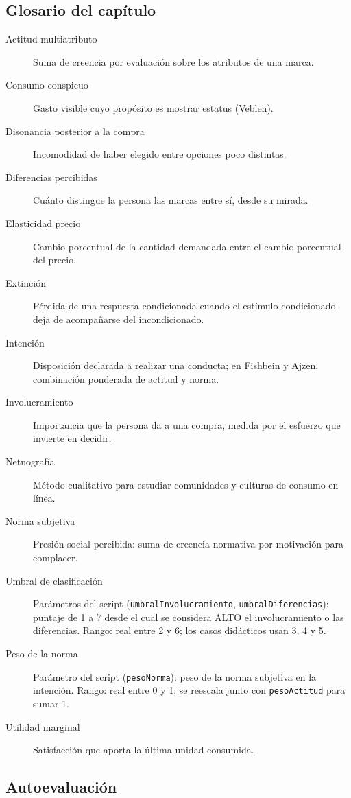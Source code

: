 \subsection*{Glosario del capítulo}
\begin{description}
  \item[Actitud multiatributo] Suma de creencia por evaluación sobre los atributos de una marca.
  \item[Consumo conspicuo] Gasto visible cuyo propósito es mostrar estatus (Veblen).
  \item[Disonancia posterior a la compra] Incomodidad de haber elegido entre opciones poco distintas.
  \item[Diferencias percibidas] Cuánto distingue la persona las marcas entre sí, desde su mirada.
  \item[Elasticidad precio] Cambio porcentual de la cantidad demandada entre el cambio porcentual del precio.
  \item[Extinción] Pérdida de una respuesta condicionada cuando el estímulo condicionado deja de acompañarse del incondicionado.
  \item[Intención] Disposición declarada a realizar una conducta; en Fishbein y Ajzen, combinación ponderada de actitud y norma.
  \item[Involucramiento] Importancia que la persona da a una compra, medida por el esfuerzo que invierte en decidir.
  \item[Netnografía] Método cualitativo para estudiar comunidades y culturas de consumo en línea.
  \item[Norma subjetiva] Presión social percibida: suma de creencia normativa por motivación para complacer.
  \item[Umbral de clasificación] Parámetros del script (\texttt{umbralInvolucramiento}, \texttt{umbralDiferencias}): puntaje de 1 a 7 desde el cual se considera ALTO el involucramiento o las diferencias. Rango: real entre 2 y 6; los casos didácticos usan 3, 4 y 5.
  \item[Peso de la norma] Parámetro del script (\texttt{pesoNorma}): peso de la norma subjetiva en la intención. Rango: real entre 0 y 1; se reescala junto con \texttt{pesoActitud} para sumar 1.
  \item[Utilidad marginal] Satisfacción que aporta la última unidad consumida.
\end{description}

\subsection*{Autoevaluación}

